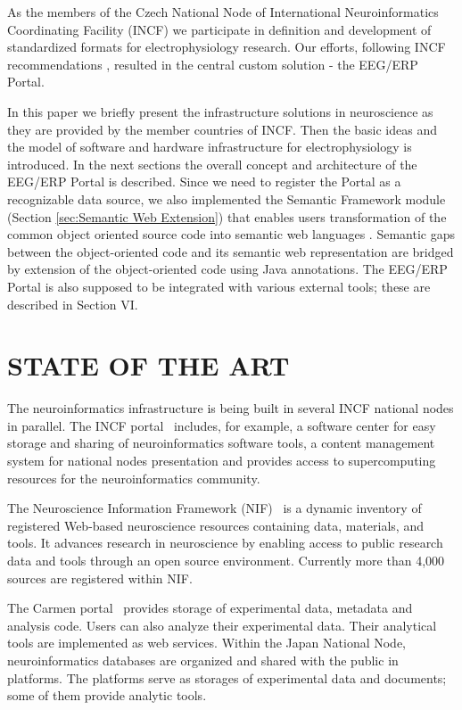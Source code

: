 \documentclass[a4paper,twoside]{article}
\begin{document}
As the members of the Czech National Node of International Neuroinformatics Coordinating Facility (INCF) \cite{incf} we participate in definition and development of standardized formats for electrophysiology research. Our efforts, following INCF recommendations \cite{incf-sustainability-report}, resulted in the central custom solution - the EEG/ERP Portal.

In this paper we briefly present the infrastructure solutions in neuroscience as they are provided by the member countries of INCF. Then the basic ideas and the model of software and hardware infrastructure for electrophysiology is introduced.  In the next sections the overall concept and architecture of the EEG/ERP Portal is described. Since we need to register the Portal as a recognizable data source, we also implemented the Semantic Framework module (Section \ref{sec:Semantic Web Extension}) that enables users transformation of the common object oriented source code into semantic web languages \cite{key-the-semantic-web}. Semantic gaps between the object-oriented code and its semantic web representation are bridged by extension of the object-oriented code using Java annotations. The EEG/ERP Portal is also supposed to be integrated with various external tools; these are described in Section VI.

\section{\label{State of the Art}\uppercase{State of the Art}}

\noindent The neuroinformatics infrastructure is being built in several INCF national nodes in parallel. The INCF portal~\cite{incf} includes, for example, a software center for easy storage and sharing of neuroinformatics software tools, a content management system for national nodes presentation and provides access to supercomputing resources for the neuroinformatics community.

The Neuroscience Information Framework (NIF)~\cite{NIF-Neuroinformatics} is a dynamic inventory of registered Web-based neuroscience resources containing data, materials, and tools. It advances research in neuroscience by enabling access to public research data and tools through an open source environment. Currently more than 4,000 sources are registered within NIF.

The Carmen portal~\cite{carmen} provides storage of experimental data, metadata and analysis code. Users can also analyze their experimental data. Their analytical tools are implemented as web services. Within the Japan National Node, neuroinformatics databases are organized and shared with the public in platforms. The platforms serve as storages of experimental data and documents; some of them provide analytic tools.
\end{document}
